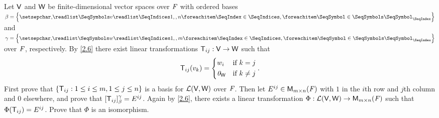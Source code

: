 \begin{ex}\label{ex:2.4.21}
	Let \(\mathsf{V}\) and \(\mathsf{W}\) be finite-dimensional vector spaces over \(\mathit{F}\) with ordered bases \(\beta = \set{\seq{v}{1,,n}}\) and \(\gamma = \set{\seq{w}{1,,m}}\) over \(\mathit{F}\), respectively.
	By \cref{2.6} there exist linear transformations \(\mathsf{T}_{i j} : \mathsf{V} \to \mathsf{W}\) such that
	\[
		\mathsf{T}_{i j}(v_k) = \begin{dcases}
			w_i      & \text{if } k = j    \\
			\mathit{0}_{\mathsf{W}} & \text{if } k \neq j
		\end{dcases}.
	\]
	First prove that \(\left\lbrace\mathsf{T}_{i j} : 1 \leq i \leq m, 1 \leq j \leq n\right\rbrace\) is a basis for \(\mathcal{L}(\mathsf{V}, \mathsf{W})\) over \(\mathit{F}\).
	Then let \(E^{i j} \in \ms\) with \(1\) in the \(i\)th row and \(j\)th column and \(0\) elsewhere, and prove that \([\mathsf{T}_{i j}]_{\beta}^{\gamma} = E^{i j}\).
	Again by \cref{2.6}, there exists a linear transformation \(\Phi : \ls(\V, \W) \to \ms\) such that \(\Phi(\mathsf{T}_{i j}) = E^{i j}\).
	Prove that \(\Phi\) is an isomorphism.
\end{ex}

